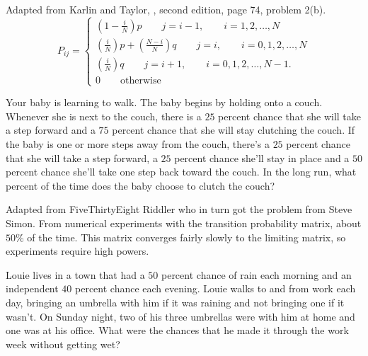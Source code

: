 \documentclass[12pt]{article}
\begin{document}
\begin{solution}
    Adapted from Karlin and Taylor, , second edition, page 74, problem 2(b).
    \[
        P_{ij} =
        \begin{cases}
            \left( 1-\frac{i}{N}\right)p \qquad j = i-1, \qquad i=1,2,\dots,N
            \\
            \left( \frac{i}{N} \right) p + \left( \frac{N-i}{N} \right)
            q \qquad j = i, \qquad i=0,1,2,\dots,N \\
            \left( \frac{i}{N} \right) q \qquad j = i+1, \qquad i=0,1,2,\dots,N-1.
            \\
            0 \qquad \text{otherwise}
        \end{cases}
    \]
\end{solution}
\begin{exercise}
    Your baby is learning to walk.  The baby begins by holding onto a
    couch.  Whenever she is next to the couch, there is a \( 25 \)
    percent chance that she will take a step forward and a \( 75 \)
    percent chance that she will stay clutching the couch.  If the baby
    is one or more steps away from the couch, there’s a \( 25 \)
    percent chance that she will take a step forward, a \( 25 \) percent
    chance she’ll stay in place and a \( 50 \) percent chance she’ll
    take one step back toward the couch.  In the long run, what percent
    of the time does the baby choose to clutch the couch?
\end{exercise}
\begin{solution}
    Adapted from 
    {FiveThirtyEight Riddler} who in turn got the problem from Steve
    Simon. From numerical experiments with the transition probability
    matrix, about \( 50\% \) of the time.  This matrix converges fairly
    slowly to the limiting matrix, so experiments require high powers.
\end{solution}
\begin{exercise}
    Louie lives in a town that had a \( 50 \) percent chance of rain
    each morning and an independent \( 40 \) percent chance each
    evening.  Louie walks to and from work each day, bringing an
    umbrella with him if it was raining and not bringing one if it
    wasn't.  On Sunday night, two of his three umbrellas were with him
    at home and one was at his office.  What were the chances that he
    made it through the work week without getting wet?
\end{exercise}
\end{document}
